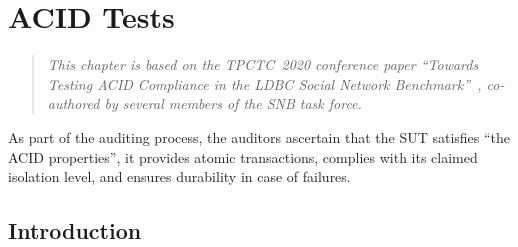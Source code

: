 \chapter{ACID Tests}
\label{sec:acid}

\newcommand{\bl}[1]{\textcolor{blue}{#1}}
\newcommand{\rd}[1]{\textcolor{red}{#1}}
\newcommand{\gn}[1]{\textcolor{green}{#1}}
\newcommand{\gy}[1]{\textcolor{grey}{\textit{#1}}}

\newcommand{\level}[1]{\textsf{#1}}
\newcommand{\anomaly}[1]{\rd{#1}}
\newcommand{\anolong}[1]{\emph{\rd{#1}}}
\newcommand{\tx}[1]{#1}

\newcommand{\cmark}{\ding{51}}
\newcommand{\xmark}{\ding{55}}


\begin{quote}
  \textit{This chapter is based on the TPCTC~2020 conference paper ``Towards Testing ACID Compliance in the LDBC Social Network Benchmark''~\cite{tpctc_acid}, co-authored by several members of the SNB task force.}
\end{quote}

As part of the auditing process, the auditors ascertain that the SUT satisfies ``the ACID properties'', \ie it provides atomic transactions, complies with its claimed isolation level, and ensures durability in case of failures.

\section{Introduction}

